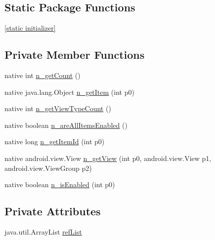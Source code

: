 \subsection*{Static Package Functions}
\begin{CompactItemize}
\item 
\hyperlink{classmd5b60ffeb829f638581ab2bb9b1a7f4f3f_1_1_table_view_model_renderer_887500bdde9d4ca81abdca920c56087c}{\mbox{[}static initializer\mbox{]}}
\end{CompactItemize}
\subsection*{Private Member Functions}
\begin{CompactItemize}
\item 
native int \hyperlink{classmd5b60ffeb829f638581ab2bb9b1a7f4f3f_1_1_table_view_model_renderer_1baebcca16ebfe05cca57f9f4a59955e}{n\_\-getCount} ()
\item 
native java.lang.Object \hyperlink{classmd5b60ffeb829f638581ab2bb9b1a7f4f3f_1_1_table_view_model_renderer_9ae34df1ef1e28d17eee02cd5ab39715}{n\_\-getItem} (int p0)
\item 
native int \hyperlink{classmd5b60ffeb829f638581ab2bb9b1a7f4f3f_1_1_table_view_model_renderer_1d2bbf52da896006bc3a9b6c93c86496}{n\_\-getViewTypeCount} ()
\item 
native boolean \hyperlink{classmd5b60ffeb829f638581ab2bb9b1a7f4f3f_1_1_table_view_model_renderer_070e14dfb258fab5686a96c5ab9e3d00}{n\_\-areAllItemsEnabled} ()
\item 
native long \hyperlink{classmd5b60ffeb829f638581ab2bb9b1a7f4f3f_1_1_table_view_model_renderer_f599d3cec6b5efd9debfe5cd196d40d7}{n\_\-getItemId} (int p0)
\item 
native android.view.View \hyperlink{classmd5b60ffeb829f638581ab2bb9b1a7f4f3f_1_1_table_view_model_renderer_d6d4f8ac83d1e67037a1478876267cb2}{n\_\-getView} (int p0, android.view.View p1, android.view.ViewGroup p2)
\item 
native boolean \hyperlink{classmd5b60ffeb829f638581ab2bb9b1a7f4f3f_1_1_table_view_model_renderer_7b449214bcb7dcbee8c9881e873e6a3e}{n\_\-isEnabled} (int p0)
\end{CompactItemize}
\subsection*{Private Attributes}
\begin{CompactItemize}
\item 
java.util.ArrayList \hyperlink{classmd5b60ffeb829f638581ab2bb9b1a7f4f3f_1_1_table_view_model_renderer_367cc615fe3d215e4dd9e298f20d871a}{refList}
\end{CompactItemize}


